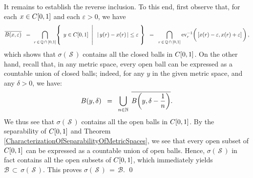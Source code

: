 It remains to establish the reverse inclusion.
To this end, first observe that, for each $x \in C[0,1]$ and each $\varepsilon > 0$, we have
\begin{equation*}
\overline{B(x,\varepsilon)}
\;\; = \left.\left.\left.\bigcap_{r\,\in\,\Q\,\cap\,[0,1]} \right\{\; y \in \Czo \;\;\right\vert\;\; \vert\,y(r) - x(r)\,\vert \leq \varepsilon \;\right\}
\;\; = \;\; \bigcap_{r\,\in\,\Q\,\cap\,[0,1]} \ev_{r}^{-1}\!\left(\,[x(r)-\varepsilon,x(r)\overset{{\color{white}1}}{+}\varepsilon]\,\right),
\end{equation*}
which shows that $\sigma\!\left(\,\mathcal{S}\,\right)$ contains all the closed balls in $C[0,1]$.
On the other hand, recall that, in any metric space, every open ball can be expressed
as a countable union of closed balls;
indeed, for any $y$ in the given metric space, and any $\delta > 0$, we have:
\begin{equation*}
B(y,\delta) \;\; = \;\; \bigcup_{n\in\mathbb{N}}\;\overline{B\!\left(y,\delta-\dfrac{1}{n}\right)}.
\end{equation*}
We thus see that $\sigma\!\left(\,\mathcal{S}\,\right)$
contains all the open balls in $C[0,1]$.
By the separability of $C[0,1]$ and Theorem \ref{CharacterizationOfSeparabilityOfMetricSpaces},
we see that every open subset of $C[0,1]$ can be expressed as a countable
union of open balls.
Hence, $\sigma\!\left(\,\mathcal{S}\,\right)$ in fact contains
all the open subsets of $C[0,1]$, which immediately yields
$\mathcal{B} \,\subset\, \sigma\!\left(\,\mathcal{S}\,\right)$.
This proves $\sigma\!\left(\,\mathcal{S}\,\right) \,=\, \mathcal{B}$.
\qed

